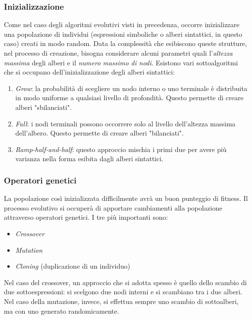 \documentclass[10pt,a4paper]{article}
\begin{document}
\subsubsection{Inizializzazione}

Come nel caso degli algoritmi evolutivi visti in precedenza, occorre inizializzare una popolazione di individui (espressioni simboliche o alberi sintattici, in questo caso) creati in modo random. Data la complessità che esibiscono queste strutture, nel processo di creazione, bisogna considerare alcuni parametri quali l'\emph{altezza massima} degli alberi e il \emph{numero massimo di nodi}. Esistono vari sottoalgoritmi che si occupano dell'inizializzazione degli alberi sintattici:

\begin{enumerate}
\item{\emph{Grow}: la probabilità di scegliere un nodo interno o uno terminale è distribuita in modo uniforme a qualsiasi livello di profondità. Questo permette di creare alberi "sbilanciati".}
\item{\emph{Full}: i nodi terminali possono occorrere solo al livello dell'altezza massima dell'albero. Questo permette di creare alberi "bilanciati".}
\item{\emph{Ramp-half-and-half}: questo approccio mischia i primi due per avere più varianza nella forma esibita dagli alberi sintattici.}
\end{enumerate}

\subsubsection{Operatori genetici}

La popolazione così inizializzata difficilmente avrà un buon punteggio di fitness. Il processo evolutivo si occuperà di apportare cambiamenti alla popolazione attraverso operatori genetici. I tre più importanti sono:

\begin{itemize}
\item{\emph{Crossover}}
\item{\emph{Mutation}}
\item{\emph{Cloning} (duplicazione di un individuo)}
\end{itemize}

Nel caso del crossover, un approccio che si adotta spesso è quello dello scambio di due sottoespressioni: si scelgono due nodi interni e si scambiano tra i due alberi. Nel caso della mutazione, invece, si effettua sempre uno scambio di sottoalberi, ma con uno generato randomicamente.  
\end{document}
